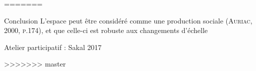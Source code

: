\documentclass[newPxFont]{beamer}
\begin{document}

=======
\begin{frame}[c]{Conclusion}
\vspace{-2em}
L'espace peut être considéré comme une production sociale (\textsc{Auriac, 2000, p.174}), et que celle-ci est robuste aux changements d'échelle
\end{frame}

{
%
\begin{frame}
  \begin{minipage}[t][.8\textheight]{\textwidth}

    \vfill

    \hfill {}

    \hfill \small{Atelier participatif : Sakal 2017}
  \end{minipage}

\end{frame}
}


>>>>>>> master
\end{document}
